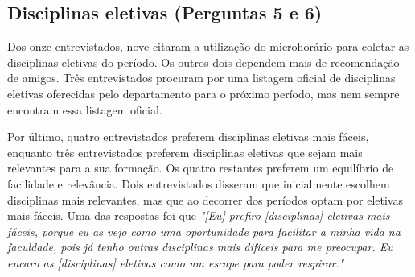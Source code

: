 \subsection{Disciplinas eletivas (Perguntas 5 e 6)}
\label{sec:disciplinas-eletivas}

Dos onze entrevistados, nove citaram a utilização do microhorário para coletar as disciplinas eletivas do período. Os outros dois dependem mais de recomendação de amigos. Três entrevistados procuram por uma listagem oficial de disciplinas eletivas oferecidas pelo departamento para o próximo período, mas nem sempre encontram essa listagem oficial.

Por último, quatro entrevistados preferem disciplinas eletivas mais fáceis, enquanto três entrevistados preferem disciplinas eletivas que sejam mais relevantes para a sua formação. Os quatro restantes preferem um equilíbrio de facilidade e relevância. Dois entrevistados disseram que inicialmente escolhem disciplinas mais relevantes, mas que ao decorrer dos períodos optam por eletivas mais fáceis. Uma das respostas foi que \textit{"[Eu] prefiro [disciplinas] eletivas mais fáceis, porque eu as vejo como uma oportunidade para facilitar a minha vida na faculdade, pois já tenho outras disciplinas mais difíceis para me preocupar. Eu encaro as [disciplinas] eletivas como um escape para poder respirar."}
